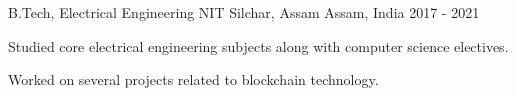 
\begin{cventries}

  \cventry
    {B.Tech, Electrical Engineering} %
    {NIT Silchar, Assam} %
    {Assam, India} %
    {2017 - 2021} %
    {
      \begin{cvitems} %
        \item {Studied core electrical engineering subjects along with computer science electives.}
        \item {Worked on several projects related to blockchain technology.}
      \end{cvitems}
    }

\end{cventries}
